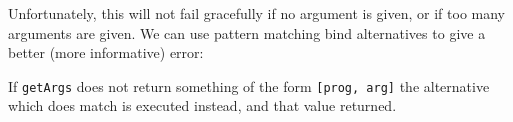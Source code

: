 \noindent
Unfortunately, this will not fail gracefully if no argument is given, or
if too many arguments are given. We can use pattern matching bind alternatives
to give a better (more informative) error:


\noindent
If \texttt{getArgs} does not return something of the form \texttt{[prog, arg]}
the alternative which does match is executed instead, and that value returned.

